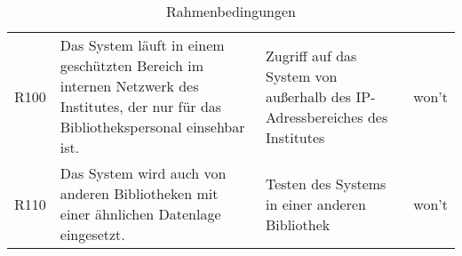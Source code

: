 \begin{table}[H]
\begin{adjustbox}{max width=\textwidth}
\begin{tabular}{lp{6.5cm}p{6.5cm}l}
        R100                              &Das System läuft in einem geschützten Bereich im internen Netzwerk des Institutes, der nur für das Bibliothekspersonal einsehbar ist. & Zugriff auf das System von außerhalb des IP-Adressbereiches des Institutes  & won't\\
        R110                              &Das System wird auch von anderen Bibliotheken mit einer ähnlichen Datenlage eingesetzt. & Testen des Systems in einer anderen Bibliothek & won't\\
       \bottomrule
    \end{tabular}
    \end{adjustbox}
    \caption{%
        Rahmenbedingungen
    }
    \label{tab:Rahmenbedingungen}
    \end{table}
\endgroup










